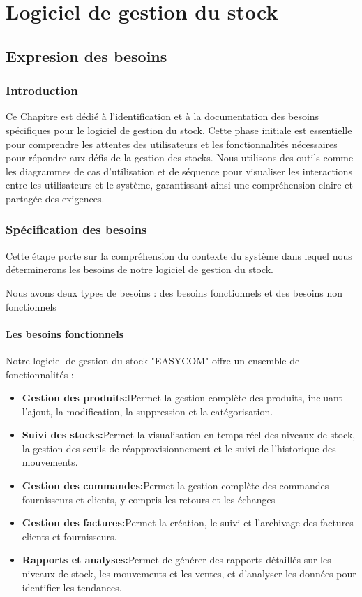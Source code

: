 \documentclass[edit,12pt,a4paper,ChapStyle,oneside,doubleinterligne]{report}
\begin{document}
\part{Logiciel de gestion du stock}

\chapter{Expresion des besoins}
\section{Introduction}
Ce Chapitre est dédié à l'identification et à la documentation des besoins spécifiques pour le logiciel de gestion du stock. Cette phase initiale est essentielle pour comprendre les attentes des utilisateurs et les fonctionnalités nécessaires pour répondre aux défis de la gestion des stocks. Nous utilisons des outils comme les diagrammes de cas d'utilisation et de séquence pour visualiser les interactions entre les utilisateurs et le système, garantissant ainsi une compréhension claire et partagée des exigences.
\section{Spécification des besoins}
Cette étape porte sur la compréhension du contexte du système dans lequel nous déterminerons les besoins de notre logiciel de gestion du stock.

Nous avons deux types de besoins : des besoins fonctionnels et des besoins non fonctionnels

\subsection{Les besoins fonctionnels }
Notre logiciel de gestion du stock "EASYCOM" offre un ensemble de fonctionnalités :
\begin{itemize}
    \item \textbf{Gestion des produits:}lPermet la gestion complète des produits, incluant l'ajout, la modification, la suppression et la catégorisation.
    \item \textbf{Suivi des stocks:}Permet la visualisation en temps réel des niveaux de stock, la gestion des seuils de réapprovisionnement et le suivi de l'historique des mouvements.
    \item \textbf{Gestion des commandes:}Permet la gestion complète des commandes fournisseurs et clients, y compris les retours et les échanges
    \item \textbf{Gestion des factures:}Permet la création, le suivi et l'archivage des factures clients et fournisseurs.
    \item \textbf{Rapports et analyses:}Permet de générer des rapports détaillés sur les niveaux de stock, les mouvements et les ventes, et d'analyser les données pour identifier les tendances.
\end{itemize}
\end{document}
